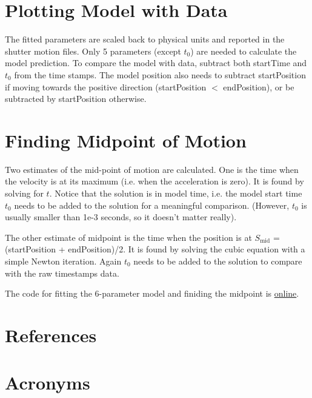 \documentclass[OPS,lsstdraft,authoryear,toc]{lsstdoc}
\begin{document}
\section{Plotting Model with Data}
The fitted parameters are scaled back to physical units and reported in the shutter motion files. Only 5 parameters (except $t_0$) are needed to calculate the model prediction. To compare the model with data, subtract both startTime and $t_0$ from the time stamps. The model position also needs to subtract startPosition if moving towards the positive direction (startPosition $<$ endPosition), or be subtracted by startPosition otherwise.

\section{Finding Midpoint of Motion}
Two estimates of the mid-point of motion are calculated. One is the time when the velocity is at its maximum (i.e. when the acceleration is zero). It is found by solving
for $t$. Notice that the solution is in model time, i.e. the model start time $t_0$ needs to be added to the solution for a meaningful comparison. (However, $t_0$ is usually smaller than 1e-3 seconds, so it doesn't matter really).

The other estimate of midpoint is the time when the position is at $S_{\mathrm{mid}}$ = (startPosition + endPosition)/2. It is found by solving the cubic equation
with a simple Newton iteration. Again $t_0$ needs to be added to the solution to compare with the raw timestamps data.

The code for fitting the 6-parameter model and finiding the midpoint is
\href{https://github.com/shuang92/StandaloneJavaShutterFitter/blob/main/src/main/java/org/lsst/ccs/standalone/shutter/fitter/StandaloneJavaShutterFitter.java}{online}.


\appendix
\section{References} \label{sec:bib}
\renewcommand{\refname}{} %


\section{Acronyms} \label{sec:acronyms}

\end{document}
